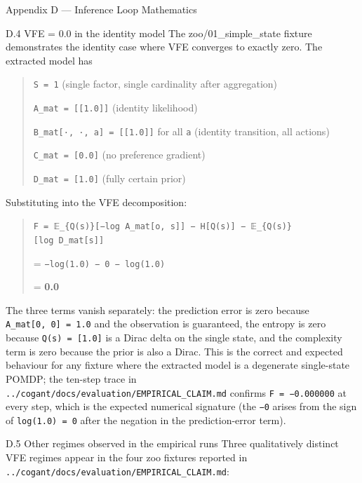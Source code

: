 \documentclass[
  ignorenonframetext,
]{beamer}
\begin{document}
\begin{frame}[fragile]{Appendix D --- Inference Loop Mathematics}
\begin{block}{D.4 VFE = 0.0 in the identity model}
\protect{}\label{d.4-vfe-0.0-in-the-identity-model}
The zoo/01\_simple\_state fixture demonstrates the identity case where
VFE converges to exactly zero. The extracted model has

\begin{quote}
\texttt{\textbar{}S\textbar{}\ =\ 1} (single factor, single cardinality
after aggregation)

\texttt{A\_mat\ =\ {[}{[}1.0{]}{]}} (identity likelihood)

\texttt{B\_mat{[}·,\ ·,\ a{]}\ =\ {[}{[}1.0{]}{]}} for all \texttt{a}
(identity transition, all actions)

\texttt{C\_mat\ =\ {[}0.0{]}} (no preference gradient)

\texttt{D\_mat\ =\ {[}1.0{]}} (fully certain prior)
\end{quote}

Substituting into the VFE decomposition:

\begin{quote}
\texttt{F\ =\ 𝔼\_\{Q(s)\}{[}−log\ A\_mat{[}o,\ s{]}{]}\ −\ H{[}Q(s){]}\ −\ 𝔼\_\{Q(s)\}{[}log\ D\_mat{[}s{]}{]}}

= \texttt{−log(1.0)\ −\ 0\ −\ log(1.0)}

= \textbf{0.0}
\end{quote}

The three terms vanish separately: the prediction error is zero because
\texttt{A\_mat{[}0,\ 0{]}\ =\ 1.0} and the observation is guaranteed,
the entropy is zero because \texttt{Q(s)\ =\ {[}1.0{]}} is a Dirac delta
on the single state, and the complexity term is zero because the prior
is also a Dirac. This is the correct and expected behaviour for any
fixture where the extracted model is a degenerate single-state POMDP;
the ten-step trace in
\texttt{../cogant/docs/evaluation/EMPIRICAL\_CLAIM.md} confirms
\texttt{F\ =\ −0.000000} at every step, which is the expected numerical
signature (the \texttt{−0} arises from the sign of
\texttt{log(1.0)\ =\ 0} after the negation in the prediction-error
term).
\end{block}

\begin{block}{D.5 Other regimes observed in the empirical runs}
\protect{}\label{d.5-other-regimes-observed-in-the-empirical-runs}
Three qualitatively distinct VFE regimes appear in the four zoo fixtures
reported in \texttt{../cogant/docs/evaluation/EMPIRICAL\_CLAIM.md}:


\end{block}
\end{frame}
\end{document}
